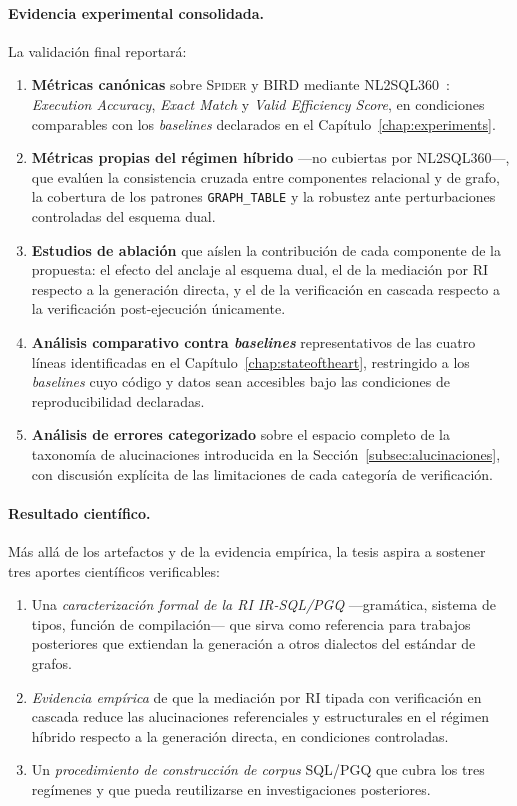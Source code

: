 \paragraph{Evidencia experimental consolidada.} La validación final reportará:

\begin{enumerate}
    \item \textbf{Métricas canónicas} sobre \textsc{Spider} y \textsc{BIRD} mediante \textsc{NL2SQL360}~\cite{SuperSQL2024}: \emph{Execution Accuracy}, \emph{Exact Match} y \emph{Valid Efficiency Score}, en condiciones comparables con los \emph{baselines} declarados en el Capítulo~\ref{chap:experiments}.
    \item \textbf{Métricas propias del régimen híbrido} ---no cubiertas por \textsc{NL2SQL360}---, que evalúen la consistencia cruzada entre componentes relacional y de grafo, la cobertura de los patrones \texttt{GRAPH\_TABLE} y la robustez ante perturbaciones controladas del esquema dual.
    \item \textbf{Estudios de ablación} que aíslen la contribución de cada componente de la propuesta: el efecto del anclaje al esquema dual, el de la mediación por \ac{RI} respecto a la generación directa, y el de la verificación en cascada respecto a la verificación post-ejecución únicamente.
    \item \textbf{Análisis comparativo contra \emph{baselines}} representativos de las cuatro líneas identificadas en el Capítulo~\ref{chap:stateoftheart}, restringido a los \emph{baselines} cuyo código y datos sean accesibles bajo las condiciones de reproducibilidad declaradas.
    \item \textbf{Análisis de errores categorizado} sobre el espacio completo de la taxonomía de alucinaciones introducida en la Sección~\ref{subsec:alucinaciones}, con discusión explícita de las limitaciones de cada categoría de verificación.
\end{enumerate}

\paragraph{Resultado científico.} Más allá de los artefactos y de la evidencia empírica, la tesis aspira a sostener tres aportes científicos verificables:

\begin{enumerate}
    \item Una \emph{caracterización formal de la \ac{RI} IR-SQL/PGQ} ---gramática, sistema de tipos, función de compilación--- que sirva como referencia para trabajos posteriores que extiendan la generación a otros dialectos del estándar de grafos.
    \item \emph{Evidencia empírica} de que la mediación por \ac{RI} tipada con verificación en cascada reduce las alucinaciones referenciales y estructurales en el régimen híbrido respecto a la generación directa, en condiciones controladas.
    \item Un \emph{procedimiento de construcción de corpus} \ac{SQL}/\ac{PGQ} que cubra los tres regímenes y que pueda reutilizarse en investigaciones posteriores.
\end{enumerate}

